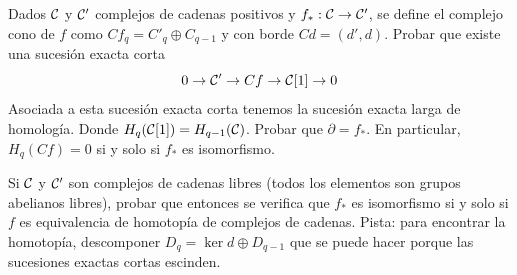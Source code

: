 \documentclass[TA.tex]{subfiles}
\begin{document}
\begin{ejer}
Dados $\mathcal{C}$ y $\mathcal{C}'$ complejos de cadenas positivos y $f_*:\mathcal{C}\to\mathcal{C}'$, se define el complejo cono de $f$ como $Cf_q=C'_q\oplus C_{q-1}$ y con borde $Cd=(d',d)$. Probar que existe una sucesión exacta corta
\[
0\to \mathcal{C}'\to Cf\to \mathcal{C}[1]\to 0
\]
Asociada a esta sucesión exacta corta tenemos la sucesión exacta larga de homología. Donde $H_q(\mathcal{C}[1])=H_{q-1}(\mathcal{C})$. Probar que $\partial=f_*$. En particular, $H_q(Cf)=0$ si y solo si $f_*$ es isomorfismo. 

Si $\mathcal{C}$ y $\mathcal{C}'$ son complejos de cadenas libres (todos los elementos son grupos abelianos libres), probar que entonces se verifica que $f_*$ es isomorfismo si y solo si $f$ es equivalencia de homotopía de complejos de cadenas.  Pista: para encontrar la homotopía, descomponer $D_q=\ker d\oplus D_{q-1}$ que se puede hacer porque las sucesiones exactas cortas escinden. 
\end{ejer}
\end{document}
